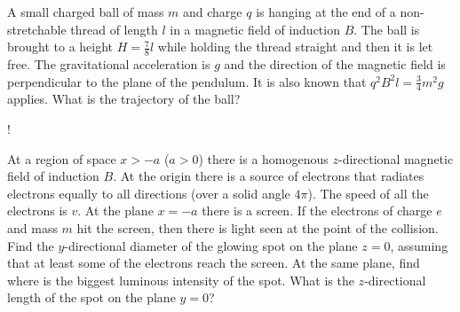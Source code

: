 \documentclass[11pt]{article}
\begin{document}
\probeng
A small charged ball of mass $m$ and charge $q$ is hanging at the end of a non-stretchable thread of length $l$ in a magnetic field of induction $B$. The ball is brought to a height $H=\frac{7}{8}l$ while holding the thread straight and then it is let free. The gravitational acceleration is $g$ and the direction of the magnetic field is perpendicular to the plane of the pendulum. It is also known that $q^2B^2l=\frac{3}{4}m^2g$ applies. What is the trajectory of the ball?
\begin{center}
\begin{resizebox}{0.5\linewidth}{!}{
}
\end{resizebox}
\end{center}
\probend
\bigskip


\probeng
At a region of space $x>-a$ ($a>0$) there is a homogenous $z$-directional magnetic field of induction $B$. At the origin there is a source of electrons that radiates electrons equally to all directions (over a solid angle $4\pi$). The speed of all the electrons is $v$. At the plane $x=-a$ there is a screen. If the electrons of charge $e$ and mass $m$ hit the screen, then there is light seen at the point of the collision. Find the $y$-directional diameter of the glowing spot on the plane $z = 0$, assuming that at least some of the electrons reach the screen. At the same plane, find where is the biggest luminous intensity of the spot. What is the $z$-directional length of the spot on the plane $y=0$?
\probend
\bigskip
\newpage\subsection{\protect{}}
\end{document}
